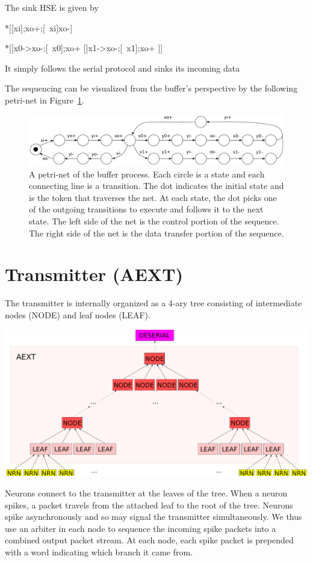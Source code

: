 \documentclass{article}
\begin{document}
\noindent
The sink HSE is given by
\begin{hse}
*[[xi];xo+;[~xi]xo-]

*[[x0->xo-;[~x0];xo+
  []x1->xo-;[~x1];xo+
 ]]
\end{hse}
It simply follows the serial protocol and sinks its incoming data

The sequencing can be visualized from the buffer's perspective by the 
following petri-net in Figure~\ref{fig:protocol_net}.
\begin{figure}
    \centering
    \includegraphics[width=.95\textwidth]{img/serial_protocol_petri_net.pdf}
    \caption{A petri-net of the buffer process.
Each circle is a state and each connecting line is a transition. The dot
indicates the initial state and is the token that traverses the net.
At each state, the dot picks one of the outgoing transitions to execute
and follows it to the next state. The left side of the net is the control
portion of the sequence. The right side of the net is the data transfer
portion of the sequence.}
    \label{fig:protocol_net}
\end{figure}

\section{Transmitter (AEXT)}

The transmitter is internally organized as a 4-ary tree consisting of intermediate
nodes (NODE) and leaf nodes (LEAF).
\begin{center}
    \includegraphics[width=.7\textwidth]{img/aext.pdf}
\end{center}
Neurons connect to the transmitter at the leaves of the tree.
When a neuron spikes, a packet travels from the attached leaf to the root of the tree.
Neurons spike asynchronously and so may signal the transmitter simultaneously. 
We thus use an arbiter in each node to sequence the incoming spike packets into a combined output packet stream.
At each node, each spike packet is prepended with a word indicating which branch it came from.
\end{document}
